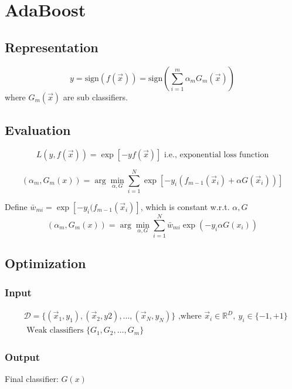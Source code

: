 \chapter{AdaBoost}


\section{Representation}

\begin{equation}
y=\text{sign}(f(\vec{x}))=\text{sign}\left(\sum\limits_{i=1}^m \alpha_mG_m(\vec{x})\right)
\end{equation}
where $G_m(\vec{x})$ are sub classifiers.


\section{Evaluation}

\begin{equation} \nonumber
L(y,f(\vec{x}))=\exp[-yf(\vec{x})] \text{  i.e., exponential loss function}
\end{equation}

\begin{equation}
(\alpha_m,G_m(x))= \arg\min_{\alpha,G} \sum_{i=1}^N \exp{[-y_i(f_{m-1}(\vec{x}_i)+\alpha G(\vec{x}_i))]}
\end{equation}

Define $\bar{w}_{mi}=\exp{[-y_i(f_{m-1}(\vec{x}_i)]}$, which is constant w.r.t. $\alpha, G$
\begin{equation}
(\alpha_m,G_m(x))= \arg\min_{\alpha,G} \sum_{i=1}^N {\bar{w}}_{mi} \exp{(-y_i \alpha G(x_i))}
\end{equation}


\section{Optimization}

\subsection{Input}
\begin{eqnarray*}
& \mathcal{D}=\{(\vec{x}_1,y_1),(\vec{x}_2,y2),\dots,(\vec{x}_N,y_N)\} \text{ ,where } \vec{x}_i \in \mathbb{R}^D,\ y_i \in \{-1,+1\} \\
& \text{ Weak classifiers } \{G_1,G_2,\dots,G_m\}
\end{eqnarray*}


\subsection{Output}
Final classifier: $G(x)$


